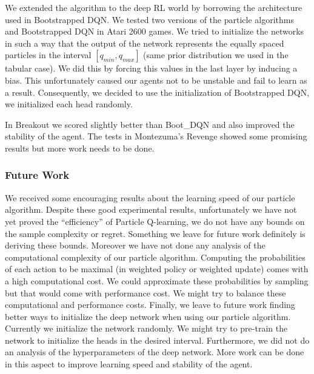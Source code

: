 We extended the algorithm to the deep RL world by borrowing the architecture used  in Bootstrapped DQN. We tested two versions of the particle algorithms and Bootstrapped DQN in Atari 2600 games. We tried to initialize the networks in such a way that the output of the network represents the equally spaced particles in the interval $[q_{min},q_{max}]$ (same prior distribution we used in the tabular case). We did this by forcing this values in the last layer by inducing a bias. This unfortunately caused our agents not to be unstable and fail to learn as a result. Consequently, we decided to use the initialization of Bootstrapped DQN, \ie we initialized each head randomly.\par 
In Breakout we scored slightly better than Boot\_DQN and also improved the stability of the agent. The tests in Montezuma's Revenge showed some promising results but more work needs to be done. 
\subsubsection{Future Work}
We received some encouraging results about the learning speed of our particle algorithm. Despite these good experimental results, unfortunately we have not yet proved the ``efficiency'' of Particle Q-learning, \ie we do not have any bounds on the sample complexity or  regret. Something we leave for future work definitely is deriving these bounds. Moreover we have not done any analysis of the computational complexity of our particle algorithm. Computing the probabilities of each action to be maximal (in weighted policy or weighted update) comes with a high computational cost. We could approximate these probabilities by sampling but that would come with performance cost. We might try to balance these computational and performance costs. Finally, we leave to future work finding better ways to initialize the deep network when using our particle algorithm. Currently we initialize the network randomly. We might try to pre-train the network to initialize the heads in the desired interval. Furthermore, we did not do an analysis of the hyperparameters of the deep network. More work can be done in this aspect to improve learning speed and stability of the agent. 